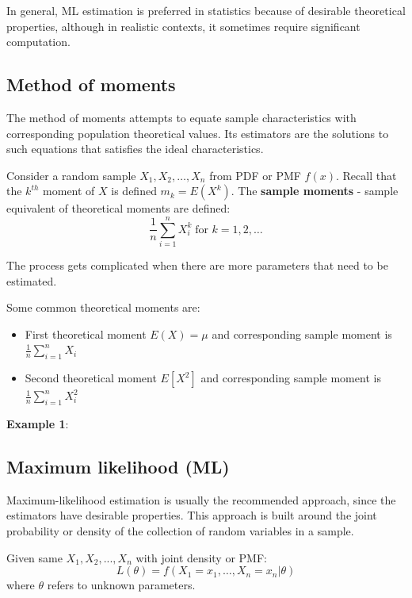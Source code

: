 \documentclass[10pt,a4paper]{article}
\begin{document}
In general, ML estimation is preferred in statistics because of desirable theoretical properties,
although in realistic contexts, it sometimes require signiﬁcant computation.

\subsection{Method of moments}

The method of moments attempts to equate sample characteristics with corresponding population
theoretical values. Its estimators are the solutions to such equations that satisfies the ideal
characteristics.

Consider a random sample $X_1, X_2,\dots, X_n$ from PDF or PMF $f(x)$.  Recall that the $k^{th}$
moment of $X$ is defined $m_k = E(X^k)$. The \textbf{sample moments} - sample equivalent of
theoretical moments are defined:
$$
    \frac{1}{n} \sum_{i=1}^n X_i^k \; \text{for } k = 1,2,\dots
$$

The process gets complicated when there are more parameters that need to be estimated.

Some common theoretical moments are:
\begin{itemize}
    \item First theoretical moment $E(X)=\mu$ and corresponding sample moment is
    $\frac{1}{n}\sum_{i=1}^n X_i$
    \item Second theoretical moment $E[X^2]$ and corresponding sample moment is
    $\frac{1}{n}\sum_{i=1}^n X_i^2$
\end{itemize}

\textbf{Example 1}: 

\subsection{Maximum likelihood (ML)}

Maximum-likelihood estimation is usually the recommended approach, since the estimators have
desirable properties. This approach is built around the joint probability or density of the
collection of random variables in a sample.

\begin{tcolorbox}[breakable,colback=white]
Given same $X_1,X_2,...,X_n$ with joint density or PMF:
$$
    L(\theta) = f(X_1 = x_1, \dots , X_n = x_n|\theta)
$$
where $\theta$ refers to unknown parameters.
\end{tcolorbox}
\end{document}
